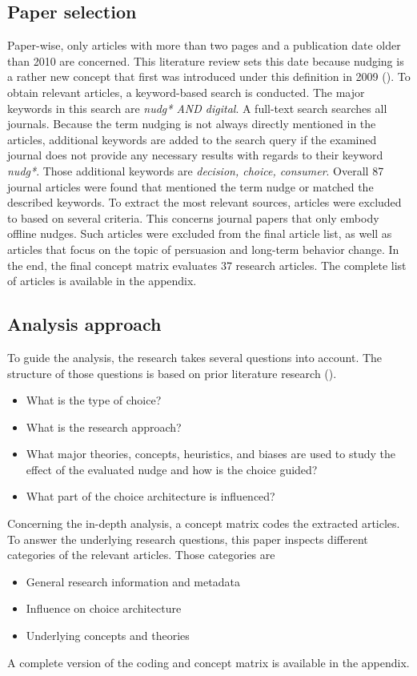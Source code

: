 \subsection{Paper selection}
Paper-wise, only articles with more than two pages and a publication date older than 2010 are concerned. This literature review sets this date because nudging is a rather new concept that first was introduced under this definition in 2009 (\cite{thaler_nudge:_2009}). To obtain relevant articles, a keyword-based search is conducted. The major keywords in this search are \textit{nudg* AND digital}. A full-text search searches all journals. Because the term nudging is not always directly mentioned in the articles, additional keywords are added to the search query if the examined journal does not provide any necessary results with regards to their keyword \textit{nudg*}. Those additional keywords are \textit{decision, choice, consumer}. Overall 87 journal articles were found that mentioned the term nudge or matched the described keywords. To extract the most relevant sources, articles were excluded to based on several criteria. This concerns journal papers that only embody offline nudges. Such articles were excluded from the final article list, as well as articles that focus on the topic of persuasion and long-term behavior change. In the end, the final concept matrix evaluates 37 research articles. The complete list of articles is available in the appendix. %

\subsection{Analysis approach}
To guide the analysis, the research takes several questions into account. The structure of those questions is based on prior literature research (\cite{alavi_review_1992}).
\begin{itemize}
\item What is the type of choice?
\item What is the research approach?
\item What major theories, concepts, heuristics, and biases are used to study the effect of the evaluated nudge and how is the choice guided?
\item What part of the choice architecture is influenced?
\end{itemize}

Concerning the in-depth analysis, a concept matrix codes the extracted articles. To answer the underlying research questions, this paper inspects different categories of the relevant articles. Those categories are 
\begin{itemize}
\item General research information and metadata
\item Influence on choice architecture
\item Underlying concepts and theories
\end{itemize}

A complete version of the coding and concept matrix is available in the appendix. %